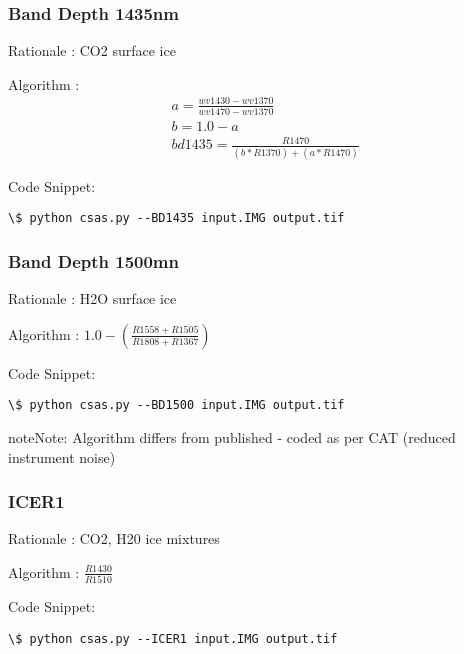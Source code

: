 \documentclass[letterpaper,10pt,english]{sphinxmanual}
\begin{document}
\subsubsection{Band Depth 1435nm}
\label{Algorithms:band-depth-1435nm}
Rationale : CO2 surface ice

Algorithm : $$\begin{aligned}
& a = \frac{wv1430 - wv1370}{wv1470 - wv1370} \nonumber\\
& b = 1.0 - a \nonumber\\
& bd1435 = \frac{R1470}{(b*R1370)+(a*R1470)}
\end{aligned}$$

Code Snippet:

\begin{Verbatim}[commandchars=\\\{\}]
\$ python csas.py --BD1435 input.IMG output.tif
\end{Verbatim}


\subsubsection{Band Depth 1500mn}
\label{Algorithms:band-depth-1500mn}
Rationale : H2O surface ice

Algorithm : $1.0 - (\frac{R1558 + R1505}{R1808 + R1367})$

Code Snippet:

\begin{Verbatim}[commandchars=\\\{\}]
\$ python csas.py --BD1500 input.IMG output.tif
\end{Verbatim}

\begin{notice}{note}{Note:}
Algorithm differs from published - coded as per CAT (reduced instrument noise)
\end{notice}


\subsubsection{ICER1}
\label{Algorithms:icer1}
Rationale : CO2, H20 ice mixtures

Algorithm : $\frac{R1430}{R1510}$

Code Snippet:

\begin{Verbatim}[commandchars=\\\{\}]
\$ python csas.py --ICER1 input.IMG output.tif
\end{Verbatim}
\end{document}
